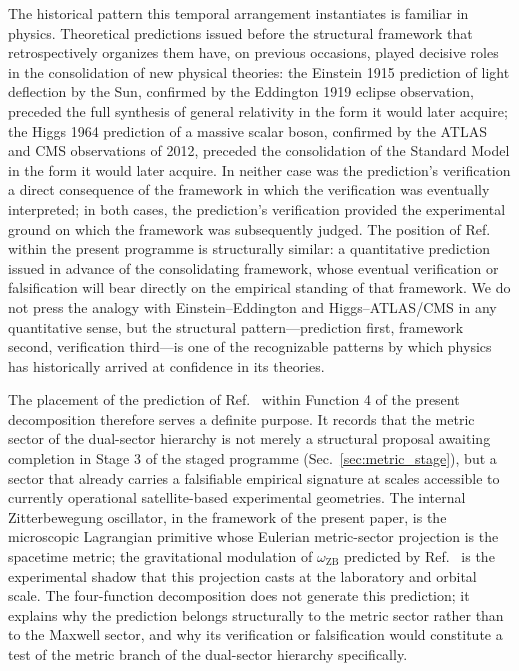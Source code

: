 \documentclass[%
 reprint, amsmath,amssymb, aps, prb, ]{revtex4-2}
\numberwithin{equation}{section}
\newcommand{\omZB}{\omega_{\text{ZB}}}
\begin{document}
The historical pattern this temporal arrangement instantiates is familiar in physics. Theoretical predictions issued before the structural framework that retrospectively organizes them have, on previous occasions, played decisive roles in the consolidation of new physical theories: the Einstein 1915 prediction of light deflection by the Sun, confirmed by the Eddington 1919 eclipse observation, preceded the full synthesis of general relativity in the form it would later acquire; the Higgs 1964 prediction of a massive scalar boson, confirmed by the ATLAS and CMS observations of 2012, preceded the consolidation of the Standard Model in the form it would later acquire. In neither case was the prediction's verification a direct consequence of the framework in which the verification was eventually interpreted; in both cases, the prediction's verification provided the experimental ground on which the framework was subsequently judged. The position of Ref.~\cite{hanamura22} within the present programme is structurally similar: a quantitative prediction issued in advance of the consolidating framework, whose eventual verification or falsification will bear directly on the empirical standing of that framework. We do not press the analogy with Einstein--Eddington and Higgs--ATLAS/CMS in any quantitative sense, but the structural pattern---prediction first, framework second, verification third---is one of the recognizable patterns by which physics has historically arrived at confidence in its theories.

The placement of the prediction of Ref.~\cite{hanamura22} within Function 4 of the present decomposition therefore serves a definite purpose. It records that the metric sector of the dual-sector hierarchy is not merely a structural proposal awaiting completion in Stage 3 of the staged programme (Sec.~\ref{sec:metric_stage}), but a sector that already carries a falsifiable empirical signature at scales accessible to currently operational satellite-based experimental geometries. The internal Zitterbewegung oscillator, in the framework of the present paper, is the microscopic Lagrangian primitive whose Eulerian metric-sector projection is the spacetime metric; the gravitational modulation of $\omZB$ predicted by Ref.~\cite{hanamura22} is the experimental shadow that this projection casts at the laboratory and orbital scale. The four-function decomposition does not generate this prediction; it explains why the prediction belongs structurally to the metric sector rather than to the Maxwell sector, and why its verification or falsification would constitute a test of the metric branch of the dual-sector hierarchy specifically.
\end{document}
